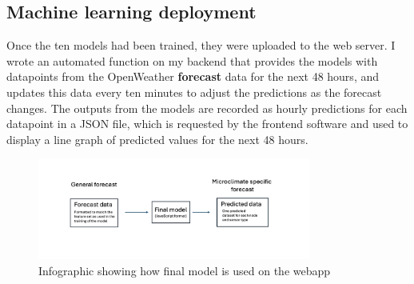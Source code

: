 \subsection{Machine learning deployment}

Once the ten models had been trained, they were uploaded to the web server.  I
wrote an automated function on my backend that provides the models with
datapoints from the OpenWeather \textbf{forecast} data for the next 48
hours, and updates this data every ten minutes to adjust the predictions as the
forecast changes. The outputs from the models are recorded as hourly predictions
for each datapoint in a JSON file, which is requested by the frontend software
and used to display a line graph of predicted values for the next 48 hours.

\begin{figure}[H]
    \centering
    \includegraphics[width=0.8\textwidth]{contents/part-3/fig3/model_diagram.png}
    \caption{Infographic showing how final model is used on the webapp}
    \label{fig:model_diagram}
\end{figure}
